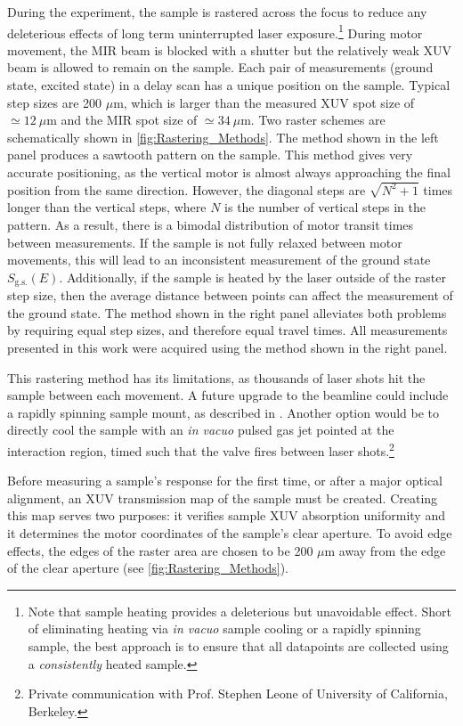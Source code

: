 During the experiment, the sample is rastered across the focus to reduce any deleterious effects of long term uninterrupted laser exposure.\footnote{Note that sample heating provides a deleterious but unavoidable effect. Short of eliminating heating via \textit{in vacuo} sample cooling or a rapidly spinning sample, the best approach is to ensure that all datapoints are collected using a \textit{consistently} heated sample.} During motor movement, the MIR beam is blocked with a shutter but the relatively weak XUV beam is allowed to remain on the sample. Each pair of measurements (ground state, excited state) in a delay scan has a unique position on the sample. Typical step sizes are 200 $\mu$m, which is larger than the measured XUV spot size of $\simeq 12 \ \mu \textrm{m}$ and the MIR spot size of $\simeq 34 \ \mu \textrm{m}$. Two raster schemes are schematically shown in \cref{fig:Rastering_Methods}. The method shown in the left panel produces a sawtooth pattern on the sample. This method gives very accurate positioning, as the vertical motor is almost always approaching the final position from the same direction. However, the diagonal steps are $\sqrt{N^2 + 1}$ times longer than the vertical steps, where $N$ is the number of vertical steps in the pattern. As a result, there is a bimodal distribution of motor transit times between measurements. If the sample is not fully relaxed between motor movements, this will lead to an inconsistent measurement of the ground state $S_{\textrm{g.s.}}(E)$. Additionally, if the sample is heated by the laser outside of the raster step size, then the average distance between points can affect the measurement of the ground state. The method shown in the right panel alleviates both problems by requiring equal step sizes, and therefore equal travel times. All measurements presented in this work were acquired using the method shown in the right panel.

This rastering method has its limitations, as thousands of laser shots hit the sample between each movement. A future upgrade to the beamline could include a rapidly spinning sample mount, as described in \cite{jagerAttosecondTransientAbsorption2018}. Another option would be to directly cool the sample with an \textit{in vacuo} pulsed gas jet pointed at the interaction region, timed such that the valve fires between laser shots.\footnote{Private communication with Prof. Stephen Leone of University of California, Berkeley.}

Before measuring a sample's response for the first time, or after a major optical alignment, an XUV transmission map of the sample must be created. Creating this map serves two purposes: it verifies sample XUV absorption uniformity and it determines the motor coordinates of the sample's clear aperture. To avoid edge effects, the edges of the raster area are chosen to be 200 $\mu$m away from the edge of the clear aperture (see \cref{fig:Rastering_Methods}).


